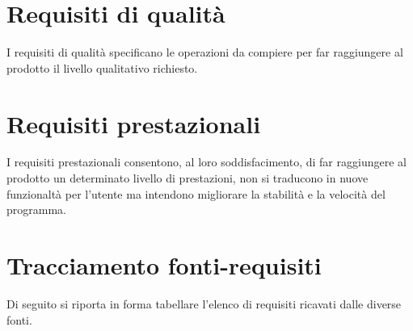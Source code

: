 \documentclass[a4paper]{report}
\begin{document}
	\section{Requisiti di qualità}
	I requisiti di qualità specificano le operazioni da compiere per far raggiungere al prodotto il livello 
	qualitativo richiesto.
	\section{Requisiti prestazionali}
	I requisiti prestazionali consentono, al loro soddisfacimento, di far raggiungere al prodotto un determinato
	livello di prestazioni, non si traducono in nuove funzionaltà per l'utente ma intendono migliorare 
	la stabilità e la velocità del programma.
	
	\section{Tracciamento fonti-requisiti}
	Di seguito si riporta in forma tabellare l'elenco di requisiti ricavati dalle diverse fonti.
	
	\cleardoublepage
	\listoffigures
	
	\cleardoublepage
	\listoftables
		
\end{document}
